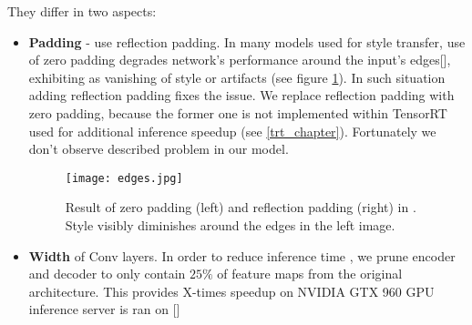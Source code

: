\documentclass[../Main.tex]{subfiles}
\begin{document}
    They differ in two aspects:
    \begin{itemize}
        \item \textbf{Padding} - \cite{Li2018} use reflection padding. In many
        models used for style transfer, use of zero padding degrades network's
        performance around the input's edges[\cite{johnson2016perceptual}], exhibiting as
        vanishing of style or artifacts (see figure \ref{fig:edges}).
        In such situation adding reflection padding fixes the issue. We replace
        reflection padding with zero padding, because the former one is not 
        implemented within TensorRT used for additional inference speedup
        (see \ref{trt_chapter}). Fortunately we don't observe described problem
        in our model.
        \begin{figure}[h!]
            \texttt{[image: edges.jpg]}
            \caption{Result of zero padding (left) and reflection padding (right)
                in \cite{johnson2016perceptual}. Style visibly diminishes around
                the edges in the left image.
            }
            \label{fig:edges}
        \end{figure}
        \item \textbf{Width} of Conv layers. In order to reduce inference time ,
        we prune encoder and decoder 
        to only contain $25\%$ of feature maps from the original architecture.
        This provides 
        X-times speedup on NVIDIA GTX 960 GPU inference server is ran on
        []
        
    \end{itemize}
\end{document}
